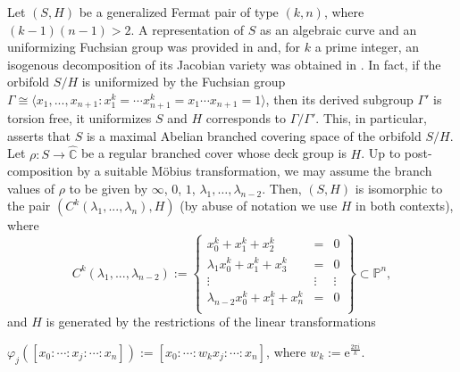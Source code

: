 \documentclass{amsart}
\newcommand{\C}[3]{\ensuremath{C^{#1}(#3_1,...,#3_{#2})}}
\begin{document}
Let $(S,H)$ be a generalized Fermat pair of type $(k,n)$, where $(k-1)(n-1)>2$. A representation of $S$ as an algebraic curve and an uniformizing Fuchsian group was provided in \cite{GHL09} and, for $k$ a prime integer, an isogenous decomposition of its Jacobian variety was obtained in \cite{CHQ15}. In fact, 
if the orbifold $S/H$ is uniformized by the Fuchsian group $\Gamma \cong\langle x_1,...,x_{n+1}: x_1^k=\cdots x_{n+1}^k=x_1\cdots x_{n+1}=1\rangle$, then 
its derived subgroup $\Gamma'$ is torsion free, it uniformizes $S$ and 
$H$ corresponds to $\Gamma/\Gamma'$. This, in particular, asserts that $S$ is a maximal Abelian branched covering space of the orbifold $S/H$. 
Let $\rho:S \to \widehat{\mathbb C}$ be a  regular branched cover whose deck group is $H$. Up to post-composition 
by a suitable M\"obius transformation, we may assume the branch values of $\rho$ to be given by 
$\infty$, $0$, $1$, $\lambda_{1},\ldots, \lambda_{n-2}$. Then, $(S,H)$ is isomorphic to the pair
$(\C{k}{n}{\lambda},H)$  (by abuse of notation we use $H$ in both contexts), where 
\begin{equation}\label{star}
 \C{k}{n-2}{\lambda}:=\left \{ \begin{array}{rcc}
              x_0^k+x_1^k+x_2^k&=&0\\
              \lambda_1x_0^k+x_1^k+x_3^k&=&0\\
              \vdots \hspace{1cm}&\vdots &\vdots\\
              \lambda_{n-2}x_0^k+x_1^k+x_n^k&=&0\\
             \end{array}\right  \}\subset {\mathbb{P}}^n,  
\end{equation}
and $H$ is generated by the restrictions of the linear transformations
\begin{center}
 $\varphi_j([x_0:\cdots:x_j:\cdots:x_n]):=[x_0:\cdots:w_kx_j:\cdots:x_n]$, where $w_k:={\mathrm{e}}^{\frac{2\pi i}{k}}$.
\end{center}
\end{document}
